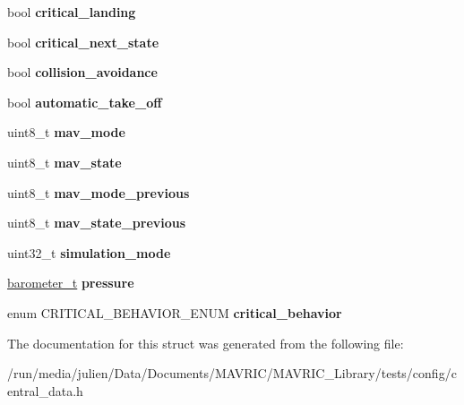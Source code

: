\begin{DoxyCompactItemize}
\item 
\hypertarget{structcentral__data__t_a414cc70034bbece86be6c8fa50150ce3}{bool {\bfseries critical\+\_\+landing}}\label{structcentral__data__t_a414cc70034bbece86be6c8fa50150ce3}

\item 
\hypertarget{structcentral__data__t_a5c4a13f84cadf0ff8027d8b150a1d95c}{bool {\bfseries critical\+\_\+next\+\_\+state}}\label{structcentral__data__t_a5c4a13f84cadf0ff8027d8b150a1d95c}

\item 
\hypertarget{structcentral__data__t_aac2fc82528b5fb28fe5d2e116eb96fab}{bool {\bfseries collision\+\_\+avoidance}}\label{structcentral__data__t_aac2fc82528b5fb28fe5d2e116eb96fab}

\item 
\hypertarget{structcentral__data__t_ad744c6e510d87ffaa9595f5fcfb63a46}{bool {\bfseries automatic\+\_\+take\+\_\+off}}\label{structcentral__data__t_ad744c6e510d87ffaa9595f5fcfb63a46}

\item 
\hypertarget{structcentral__data__t_ac6a2d2b82eee258457e29c57cce7ac7e}{uint8\+\_\+t {\bfseries mav\+\_\+mode}}\label{structcentral__data__t_ac6a2d2b82eee258457e29c57cce7ac7e}

\item 
\hypertarget{structcentral__data__t_aa17545fcd4140295d58d27cd816efb88}{uint8\+\_\+t {\bfseries mav\+\_\+state}}\label{structcentral__data__t_aa17545fcd4140295d58d27cd816efb88}

\item 
\hypertarget{structcentral__data__t_acdee49e447bab22fed2730aae83a2c56}{uint8\+\_\+t {\bfseries mav\+\_\+mode\+\_\+previous}}\label{structcentral__data__t_acdee49e447bab22fed2730aae83a2c56}

\item 
\hypertarget{structcentral__data__t_ad7ff43ca47f5d84e50b3d466ecb968ab}{uint8\+\_\+t {\bfseries mav\+\_\+state\+\_\+previous}}\label{structcentral__data__t_ad7ff43ca47f5d84e50b3d466ecb968ab}

\item 
\hypertarget{structcentral__data__t_adc8f00e9dc0f4af1a5f87261a002e5e7}{uint32\+\_\+t {\bfseries simulation\+\_\+mode}}\label{structcentral__data__t_adc8f00e9dc0f4af1a5f87261a002e5e7}

\item 
\hypertarget{structcentral__data__t_a1adad16a460b8d3b4452aa1961bb198b}{\hyperlink{structbarometer__t}{barometer\+\_\+t} {\bfseries pressure}}\label{structcentral__data__t_a1adad16a460b8d3b4452aa1961bb198b}

\item 
\hypertarget{structcentral__data__t_a38b42ac2fa14635d739df7149bc90b16}{enum C\+R\+I\+T\+I\+C\+A\+L\+\_\+\+B\+E\+H\+A\+V\+I\+O\+R\+\_\+\+E\+N\+U\+M {\bfseries critical\+\_\+behavior}}\label{structcentral__data__t_a38b42ac2fa14635d739df7149bc90b16}

\end{DoxyCompactItemize}


The documentation for this struct was generated from the following file\+:\begin{DoxyCompactItemize}
\item 
/run/media/julien/\+Data/\+Documents/\+M\+A\+V\+R\+I\+C/\+M\+A\+V\+R\+I\+C\+\_\+\+Library/tests/config/central\+\_\+data.\+h\end{DoxyCompactItemize}

